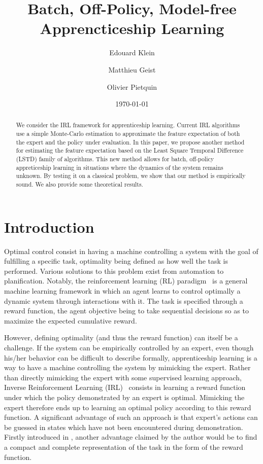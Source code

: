 \documentclass{jfpda2011}
\title{Batch, Off-Policy, Model-free Apprencticeship Learning}
\author{Edouard Klein\inst{1}\inst{3} \and Matthieu Geist\inst{1} \and Olivier Pietquin\inst{1}\inst{2}}
\institute{
 1. Supélec-Metz Campus, IMS Research group, France, \texttt{nom.prenom@supelec.fr}\\
 2. UMI 2958 CNRS - GeorgiaTech, France\\
 3. Equipe ABC, Loria, INRIA Grand-Est, Nancy, France.
 }
\date{\today}
\begin{document}
\maketitle
\begin{abstract}
We consider the IRL framework for apprenticeship learning. %
Current IRL algorithms use a simple Monte-Carlo estimation to approximate the feature expectation of both the expert and the policy under evaluation. %
In this paper, we propose another method for estimating the feature expectation based on the Least Square Temporal Difference (LSTD) family of algorithms. %
This new method allows for batch, off-policy appreticeship learning in situations where the dynamics of the system remains unknown. %
By testing it on a classical problem, we show that our method is empirically sound.%
We also provide some theoretical results.%
\end{abstract}
\section{Introduction}

Optimal control consist in having a machine controlling a system
with the goal of fulfilling a specific task, optimality being
defined as how well the task is performed. Various solutions to this
problem exist from automation to planification. Notably, the
reinforcement learning (RL) paradigm~\citep{sutton1998reinforcement} is a general
machine learning framework in which an agent learns to control
optimally a dynamic system through interactions with it. The task is
specified through a reward function, the agent objective being to
take sequential decisions so as to maximize the expected cumulative
reward.

However, defining optimality (and thus the reward function) can
itself be a challenge. If the system can be empirically controlled
by an expert, even though his/her behavior can be difficult to
describe formally, apprenticeship learning is a way to have a
machine controlling the system by mimicking the expert. Rather than
directly mimicking the expert with some supervised learning
approach, Inverse Reinforcement Learning (IRL)~\citep{ng2000algorithms}
consists in learning a reward function under which the policy
demonstrated by an expert is optimal. Mimicking the expert therefore
ends up to learning an optimal policy according to this reward
function. A significant advantage of such an approach is that
expert's actions can be guessed in states which have not been
encountered during demonstration. Firstly introduced in \citep{russell1998learning}, another advantage claimed by the author would be to
find a compact and complete representation of the task in the form
of the reward function.
\end{document}
